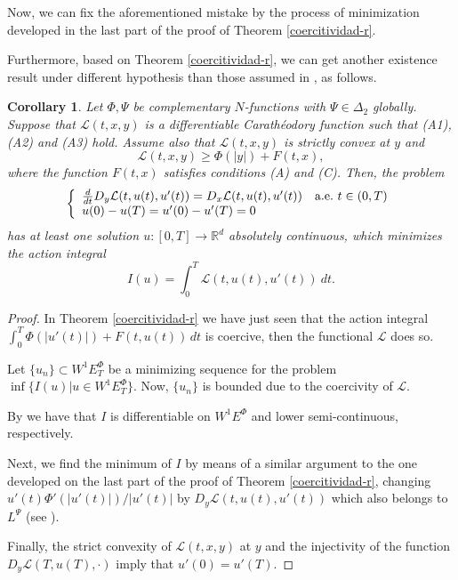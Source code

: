 \documentclass[twoside]{article}
\newtheorem{cor}[thm]{Corollary}
\theoremstyle{remark}
\newcommand{\lpsi}{L^{\Psi}}
\newcommand{\ephi}{E^{\Phi}}
\newcommand{\wphiet}{W^{1}\ephi_T}
\newcommand{\wphie}{W^{1}\ephi}
\newcommand{\rr}{\mathbb{R}}
\renewcommand{\geq}{\geqslant}
\begin{document}
Now, we can fix the aforementioned mistake by the process of minimization developed 
in the last part of the proof of Theorem \ref{coercitividad-r}.

Furthermore, based on Theorem \ref{coercitividad-r},
we can get another existence result under different hypothesis  than those assumed in \cite[Thm. 6.2]{ABGMS2015}, as follows.


\begin{cor}
Let $\Phi,\Psi$ be complementary $N$-functions with $\Psi \in \Delta_2$ globally. 
Suppose that  $\mathcal{L}(t,x,y)$ is a differentiable Carath\'eodory function such that (A1),(A2) and (A3) hold. 
Assume also that $\mathcal{L}(t,x,y)$ is strictly convex at $y$ and 
\begin{equation}
\mathcal{L}(t,x,y) \geq \Phi\left(|y|\right)+ F(t,x),
\end{equation}
where the function $F(t,x)$ satisfies conditions (A) and (C).
Then, the problem
\begin{equation}\label{P}
    \left\{%
\begin{array}{ll}
  \frac{d}{dt} D_{y}\mathcal{L}(t,u(t),u'(t))= D_{x}\mathcal{L}(t,u(t),u'(t)) \quad \hbox{a.e.}\ t \in (0,T)\\
    u(0)-u(T)=u'(0)-u'(T)=0
\end{array}%
\right.
\end{equation}
has at least one solution $u:[0,T]\to\rr^d$ absolutely continuous, 
which minimizes the action integral
\begin{equation}\label{integral_accion}
I(u)=\int_{0}^T \mathcal{L}(t,u(t),u'(t))\ dt.
\end{equation}
\end{cor}


\begin{proof}
In Theorem \ref{coercitividad-r} we have just seen that the action integral 
$\int_0^T \Phi(|u'(t)|)+F(t,u(t))\,dt$
is coercive, then the functional $\mathcal L$ does so. 

Let $\{u_n\}\subset \wphiet$ be   a  minimizing sequence for the problem  $\inf\{I(u)|u\in\wphiet\}$.
Now, $\{u_n\}$ is bounded due to the coercivity of $\mathcal{L}$. 

By \cite[Thm. 3.2, Lemma 6.1]{ABGMS2015} we have that $I$ is differentiable on $\wphie$ and lower semi-continuous, respectively.

Next, we find the minimum of $I$ by means of a similar argument to the one developed 
on the last part of the proof of Theorem \ref{coercitividad-r}, 
changing  $u'(t)\Phi'(|u'(t)|)/|u'(t)|$ by $D_{y}\mathcal{L}(t,u(t),u'(t))$  which also belongs to $\lpsi$  
(see \cite[Eq. (26)]{ABGMS2015}). 

Finally, the strict convexity of $\mathcal{L}(t,x,y)$ at $y$ and the injectivity of 
the function $D_y\mathcal{L}(T,u(T),\cdot)$ imply that $u'(0)=u'(T)$.
\end{proof}
\end{document}
